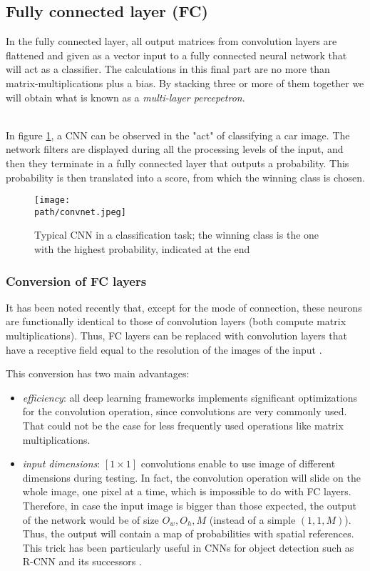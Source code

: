 \subsection{Fully connected layer (FC)}

In the fully connected layer, all output matrices from convolution layers are flattened and given as a vector input to a fully connected neural network that will act as a classifier. The calculations in this final part are no more than matrix-multiplications plus a bias. By stacking three or more of them together we will obtain what is known as a \emph{multi-layer percepetron}.  

\\In figure \ref{fig:cnn3}, a CNN can be observed in the "act" of classifying a car image. The network filters are displayed during all the processing levels of the input, and then they terminate in a fully connected layer that outputs a probability. This probability is then translated into a score, from which the winning class is chosen.

\begin{figure}[h!]
 \centering
 \texttt{[image: \\path/convnet.jpeg]} 
 \caption{Typical CNN in a classification task; the winning class is the one with the highest probability, indicated at the end}
 \label{fig:cnn3}
\end{figure}

\subsubsection{Conversion of FC layers}
It has been noted recently that, except for the mode of connection, these neurons are functionally identical to those of convolution layers (both compute matrix multiplications). Thus, FC layers can be replaced with convolution layers that have a receptive field equal to the resolution of the images of the input \parencite{WCS231layer}. 

This conversion has two main advantages: 
\begin{itemize}
    \item \emph{efficiency}: all deep learning frameworks implements significant optimizations for the convolution operation, since convolutions are very commonly used. That could not be the case for less frequently used operations like matrix multiplications.
    
    \item \emph{input dimensions}: $[1 \times 1]$ convolutions enable to use image of different dimensions during testing. In fact, the convolution operation will slide on the whole image, one pixel at a time, which is impossible to do with FC layers. Therefore, in case the input image is bigger than those expected, the output of the network would be of size $O_w,O_h,M$ (instead of a simple $(1,1,M)$). Thus, the output will contain a map of probabilities with spatial references. This trick has been particularly useful in CNNs for object detection such as R-CNN and its successors \parencite{rcnn}. 
\end{itemize}



